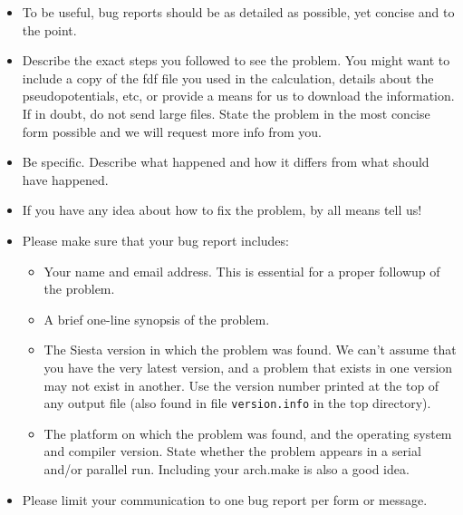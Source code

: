 \documentclass[11pt]{article}
\begin{document}
\begin{itemize}

\item To be useful, bug reports should be as detailed as possible, yet
concise and to the point.

\item Describe the exact steps you followed to see the problem. You
  might want to include a copy of the fdf file you used in the
  calculation, details about the pseudopotentials, etc, or provide a
  means for us to download the information. If in doubt, do not send large
  files. State the problem in the most concise form possible and we
  will request more info from you.

\item Be specific. Describe what happened and how it differs from what
  should have happened.

\item If you have any idea about how to fix the problem, by all means
tell us!

\item Please make sure that your bug report includes:

\begin{itemize}

\item Your name and email address.  This is essential for a proper
followup of the problem.

\item A brief one-line synopsis of the problem.

\item The {\sc Siesta} version in which the problem was found. We
  can't assume that you have the very latest version, and a problem
  that exists in one version may not exist in another. Use the version
  number printed at the top of any output file (also found in file
  {\tt version.info} in the top directory).

\item The platform on which the problem was found, and the operating
  system and compiler version. State whether the problem appears in a
  serial and/or parallel run. Including your arch.make is also a good idea.

\end{itemize}

\item Please limit your communication to one bug report per form or message.

\end{itemize}
\end{document}
